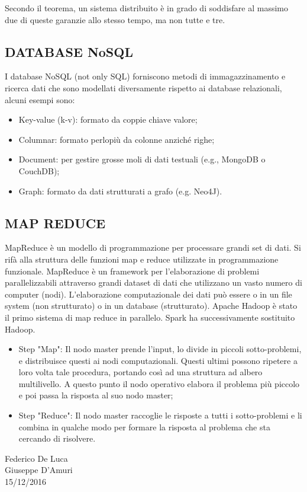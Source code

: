 Secondo il teorema, un sistema distribuito è in grado di soddisfare al massimo due di queste garanzie allo stesso tempo, ma non tutte e tre.  


\subsection{DATABASE NoSQL}

I database NoSQL (not only SQL) forniscono metodi di immagazzinamento e ricerca dati che sono modellati diversamente rispetto ai database relazionali, alcuni esempi sono: 

\begin{itemize}

\item{Key-value (k-v)}: formato da coppie chiave valore;
\item{Columnar}: formato perlopiù da colonne anziché righe;
\item{Document}: per gestire grosse moli di dati testuali (e.g., MongoDB o CouchDB);
\item{Graph}: formato da dati strutturati a grafo (e.g. Neo4J).
\end{itemize}


\subsection{MAP REDUCE}

MapReduce è un modello di programmazione per processare grandi set di dati. Si rifà alla struttura delle funzioni map e reduce utilizzate in programmazione funzionale. MapReduce è un framework per l'elaborazione di problemi parallelizzabili attraverso grandi dataset di dati che utilizzano un vasto numero di computer (nodi). L'elaborazione computazionale dei dati può essere o in un file system (non strutturato) o in un database (strutturato). Apache Hadoop è stato il primo sistema  di map reduce in parallelo. Spark ha successivamente sostituito Hadoop.  

\begin{itemize}

\item{Step "Map"}: Il nodo master prende l'input, lo divide in piccoli sotto-problemi, e distribuisce questi ai nodi computazionali. Questi ultimi possono ripetere a loro volta tale procedura, portando così  ad una struttura ad albero multilivello. A questo punto il nodo operativo elabora il problema più piccolo e poi passa la risposta al suo nodo master;
\item{Step "Reduce"}: Il nodo master raccoglie le risposte a tutti i sotto-problemi e li combina in qualche modo per formare la risposta al problema che sta cercando di risolvere. 

\end{itemize}



\begin{flushright}Federico De Luca\\Giuseppe D'Amuri\\15/12/2016\end{flushright}